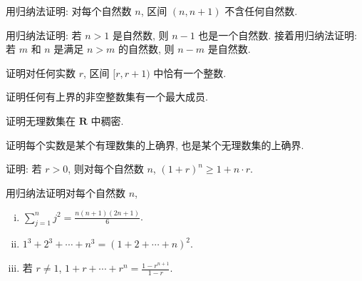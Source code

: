 \documentclass[../../main.tex]{subfiles}
\begin{document}
\begin{exercise}\label{exercise:ch01-08}
用归纳法证明: 对每个自然数 $n$, 区间 $(n,n+1)$ 不含任何自然数.
\end{exercise}

\begin{exercise}\label{exercise:ch01-09}
用归纳法证明: 若 $n>1$ 是自然数, 则 $n-1$ 也是一个自然数. 接着用归纳法证明: 若 $m$ 和 $n$ 是满足 $n>m$ 的自然数, 则 $n-m$ 是自然数.
\end{exercise}

\begin{exercise}\label{exercise:ch01-10}
证明对任何实数 $r$, 区间 $[r,r+1)$ 中恰有一个整数.
\end{exercise}

\begin{exercise}\label{exercise:ch01-11}
证明任何有上界的非空整数集有一个最大成员.
\end{exercise}

\begin{exercise}\label{exercise:ch01-12}
证明无理数集在 $\mathbf{R}$ 中稠密.
\end{exercise}

\begin{exercise}\label{exercise:ch01-13}
证明每个实数是某个有理数集的上确界, 也是某个无理数集的上确界.
\end{exercise}

\begin{exercise}\label{exercise:ch01-14}
证明: 若 $r>0$, 则对每个自然数 $n$, $(1+r)^{n}\geqslant 1+n\cdot r$.
\end{exercise}

\begin{exercise}\label{exercise:ch01-15}
用归纳法证明对每个自然数 $n$,
\begin{enumerate}[(i)]
\item $\displaystyle\sum_{j=1}^{n}j^{2}=\frac{n(n+1)(2n+1)}{6}$.
\item $1^{3}+2^{3}+\cdots+n^{3}=(1+2+\cdots+n)^{2}$.
\item 若 $r\neq 1$, $\displaystyle 1+r+\cdots+r^{n}=\frac{1-r^{n+1}}{1-r}$.
\end{enumerate}
\end{exercise}
\end{document}
